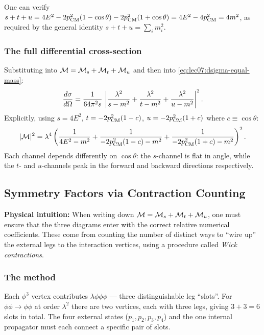 \documentclass[../main.tex]{subfiles}
\begin{document}
\begin{remark}[Sanity check: $s+t+u = 4m^2$]
One can verify $s+t+u = 4E^2 - 2p_{\rm CM}^2(1-\cos\theta) - 2p_{\rm CM}^2(1+\cos\theta) = 4E^2 - 4p_{\rm CM}^2 = 4m^2$, as required by the general identity $s+t+u=\sum_i m_i^2$.
\end{remark}

\subsubsection*{The full differential cross-section}

Substituting into $\mathcal{M} = \mathcal{M}_s + \mathcal{M}_t + \mathcal{M}_u$ and then into \eqref{eq:lec07:dsigma-equal-mass}:
\begin{equation}
  \frac{d\sigma}{d\Omega} = \frac{1}{64\pi^2 s}\,\left|
    \frac{\lambda^2}{s-m^2}
    + \frac{\lambda^2}{t-m^2}
    + \frac{\lambda^2}{u-m^2}
  \right|^2.
  \label{eq:lec07:dsigma-full}
\end{equation}
Explicitly, using $s = 4E^2$, $t = -2p_{\rm CM}^2(1-c)$, $u = -2p_{\rm CM}^2(1+c)$ where $c\equiv\cos\theta$:
\begin{equation}
  |\mathcal{M}|^2 = \lambda^4\left(
    \frac{1}{4E^2 - m^2}
    + \frac{1}{-2p_{\rm CM}^2(1-c)-m^2}
    + \frac{1}{-2p_{\rm CM}^2(1+c)-m^2}
  \right)^2.
  \label{eq:lec07:M2-explicit}
\end{equation}
Each channel depends differently on $\cos\theta$: the $s$-channel is flat in angle, while the $t$- and $u$-channels peak in the forward and backward directions respectively.

\subsection*{Symmetry Factors via Contraction Counting}

\noindent\textbf{Physical intuition:} When writing down $\mathcal{M} = \mathcal{M}_s + \mathcal{M}_t + \mathcal{M}_u$, one must ensure that the three diagrams enter with the correct relative numerical coefficients.  These come from counting the number of distinct ways to ``wire up'' the external legs to the interaction vertices, using a procedure called \emph{Wick contractions}.

\subsubsection*{The method}

Each $\phi^3$ vertex contributes $\lambda\phi\phi\phi$ — three distinguishable leg ``slots''.  For $\phi\phi\to\phi\phi$ at order $\lambda^2$ there are two vertices, each with three legs, giving $3+3=6$ slots in total.  The four external states ($p_1, p_2, p_3, p_4$) and the one internal propagator must each connect a specific pair of slots.
\end{document}
